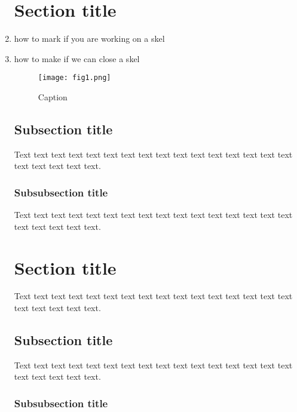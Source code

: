 \documentclass{iucrjournals}
\begin{document}
\begin{enumerate}
\section{Section title}
\item \doing how to mark if you are working on a skel
\item \done how to make if we can close a skel

\begin{figure}[ht] %
\label{fig:figure1}
\begin{center}
\texttt{[image: fig1.png]} %
\end{center}
\caption{Caption \protect\cite{knuth84}} %
\end{figure}

\subsection{Subsection title}

Text text text text text text text text text text text text text text
text text text text text text text.

\subsubsection{Subsubsection title}

Text text text text text text text text text text text text text text
text text text text text text text.



\section{Section title}

Text text text text text text text text text text text text text text
text text text text text text text.

\subsection{Subsection title}

Text text text text text text text text text text text text text text
text text text text text text text.

\subsubsection{Subsubsection title}


\end{enumerate}
\end{document}
